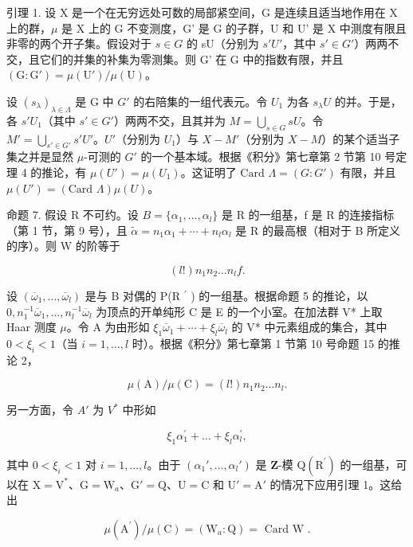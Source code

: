 引理 1. 设 X 是一个在无穷远处可数的局部紧空间，G 是连续且适当地作用在 X 上的群，\(\mu\) 是 X 上的 G 不变测度，G' 是 G 的子群，U 和 U' 是 X 中测度有限且非零的两个开子集。假设对于 \(s \in G\) 的 sU（分别为 \(s'U'\)，其中 \(s' \in G'\)）两两不交，且它们的并集的补集为零测集。则 G' 在 G 中的指数有限，并且 \((\mathrm{G} : \mathrm{G}') = \mu(\mathrm{U}') / \mu(\mathrm{U})\)。

设 \((s_{\lambda})_{\lambda \in \Lambda}\) 是 G 中 \(G'\) 的右陪集的一组代表元。令 \(U_1\) 为各 \(s_{\lambda}U\) 的并。于是，各 \(s'U_1\)（其中 \(s' \in G'\)）两两不交，且其并为 \(M = \bigcup_{s \in G} sU\)。令 \(M' = \bigcup_{s' \in G'} s'U'\)。\(U'\)（分别为 \(U_1\)）与 \(X - M'\)（分别为 \(X - M\)）的某个适当子集之并是显然 \(\mu\)-可测的 \(G'\) 的一个基本域。根据《积分》第七章第 2 节第 10 号定理 4 的推论，有 \(\mu(U') = \mu(U_1)\)。这证明了 \(\text{Card } \Lambda = (G : G')\) 有限，并且 \(\mu(U') = (\text{Card } \Lambda)\mu(U)\)。

命题 7. 假设 R 不可约。设 \(B = \{\alpha_{1}, \ldots, \alpha_{l}\}\) 是 R 的一组基，f 是 R 的连接指标（第 1 节，第 9 号），且 \(\tilde{\alpha} = n_{1}\alpha_{1} + \cdots + n_{l}\alpha_{l}\) 是 R 的最高根（相对于 B 所定义的序）。则 W 的阶等于

\[
(l!) n _ {1} n _ {2} \dots n _ {l} f.
\]

设 \((\overline{\omega}_{1},\ldots,\overline{\omega}_{l})\) 是与 B 对偶的 P(R \(^{\prime}\) ) 的一组基。根据命题 5 的推论，以 \(0,n_{1}^{-1}\overline{\omega}_{1},\ldots,n_{l}^{-1}\overline{\omega}_{l}\) 为顶点的开单纯形 C 是 E 的一个小室。在加法群 V* 上取 Haar 测度 \(\mu\)。令 A 为由形如 \(\xi_{1}\overline{\omega}_{1}+\cdots+\xi_{l}\overline{\omega}_{l}\) 的 V* 中元素组成的集合，其中 \(0<\xi_{i}<1\)（当 \(i=1,\ldots,l\) 时）。根据《积分》第七章第 1 节第 10 号命题 15 的推论 2，

\[
\mu (\mathrm{A}) / \mu (\mathrm{C}) = (l!) n _ {1} n _ {2} \dots n _ {l}.\tag{5}
\]

另一方面，令 \(A'\) 为 \(V^{*}\) 中形如

\[
\xi_ {1} \alpha_ {1} ^ {\prime} + \dots + \xi_ {l} \alpha_ {l} ^ {\prime},
\]

其中 \(0 < \xi_i < 1\) 对 \(i = 1, \ldots, l\)。由于 \((\alpha_1', \ldots, \alpha_l')\) 是 \(\mathbf{Z}\)-模 \(\mathrm{Q}(\mathrm{R}^{\prime})\) 的一组基，可以在 \(\mathrm{X} = \mathrm{V}^*\)、\(\mathrm{G} = \mathrm{W}_a\)、\(\mathrm{G}' = \mathrm{Q}\)、\(\mathrm{U} = \mathrm{C}\) 和 \(\mathrm{U}' = \mathrm{A}'\) 的情况下应用引理 1。这给出

\[
\mu \left(\mathrm{A} ^ {\prime}\right) / \mu (\mathrm{C}) = \left(\mathrm{W} _ {a}: \mathrm{Q}\right) = \text { Card   W }.\tag{6}
\]

